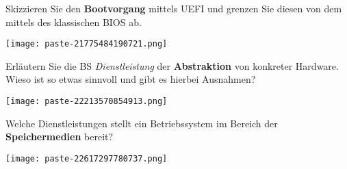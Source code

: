 \documentclass{article}
\begin{document}
\begin{tcolorbox}[colback=white!10!white,colframe=lightgray!75!black,
  savelowerto=\jobname_ex.tex,breakable,enhanced,lines before break=40]

\begin{center}
Skizzieren Sie den 
\textbf{Bootvorgang
} mittels UEFI und grenzen Sie diesen von dem mittels des klassischen BIOS ab.

\end{center}

\tcblower

\justifying
\begin{center}
\texttt{[image: paste-21775484190721.png]}
\end{center}

\end{tcolorbox}
\begin{tcolorbox}[colback=white!10!white,colframe=lightgray!75!black,
  savelowerto=\jobname_ex.tex,breakable,enhanced,lines before break=40]

\begin{center}
Erläutern Sie die BS
\textit{Dienstleistung
}der 
\textbf{Abstraktion
}von konkreter Hardware. Wieso ist so etwas sinnvoll und gibt es hierbei Ausnahmen?

\end{center}

\tcblower

\justifying
\begin{center}
\texttt{[image: paste-22213570854913.png]}
\end{center}

\end{tcolorbox}
\begin{tcolorbox}[colback=white!10!white,colframe=lightgray!75!black,
  savelowerto=\jobname_ex.tex,breakable,enhanced,lines before break=40]

\begin{center}
Welche Dienstleistungen stellt ein Betriebssystem im Bereich der 
\textbf{Speichermedien
} bereit?

\end{center}

\tcblower

\justifying
\begin{center}
\texttt{[image: paste-22617297780737.png]}
\end{center}

\end{tcolorbox}
\end{document}
